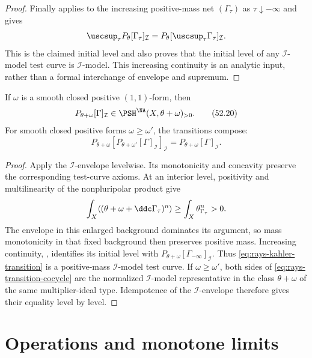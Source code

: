 \begin{proof}
Finally \cite[Proposition~3.2.13]{XiaBook} applies to the increasing
positive-mass net $(\Gamma_\tau)$ as $\tau\downarrow-\infty$ and gives
\[
 \uscsup_\tau P_\theta[\Gamma_\tau]_{\mathcal I}
 =P_\theta[\uscsup_\tau\Gamma_\tau]_{\mathcal I}.
\]
This is the claimed initial level and also proves that the initial level
of any $\mathcal I$-model test curve is $\mathcal I$-model.
This increasing continuity is an analytic input, rather than a formal
interchange of envelope and supremum.
\end{proof}

\begin{proposition}\label{prop:rays-kahler-transition}
If $\omega$ is a smooth closed positive $(1,1)$-form, then
\[
 P_{\theta+\omega}[\Gamma]_{\mathcal I}
 \in\PSH^{\NA}(X,\theta+\omega)_{>0}.
\tag{52.20}\label{eq:rays-kahler-transition}
\]
For smooth closed positive forms $\omega\geq\omega'$, the transitions compose:
\[
 P_{\theta+\omega}
 [P_{\theta+\omega'}[\Gamma]_{\mathcal I}]_{\mathcal I}
 =P_{\theta+\omega}[\Gamma]_{\mathcal I}.
\tag{52.21}\label{eq:rays-transition-cocycle}
\]
\end{proposition}

\begin{proof}
Apply the $\mathcal I$-envelope levelwise. Its monotonicity and
concavity preserve the corresponding test-curve axioms. At an interior
level, positivity and multilinearity of the nonpluripolar product give
\[
 \int_X\langle(\theta+\omega+\ddc\Gamma_\tau)^n\rangle
 \geq\int_X\theta_{\Gamma_\tau}^n>0.
\]
The envelope in this enlarged background dominates its argument, so
mass monotonicity in that fixed background then preserves positive mass.
Increasing continuity, \cite[Proposition~3.2.13]{XiaBook}, identifies its
initial level with $P_{\theta+\omega}[\Gamma_{-\infty}]_{\mathcal I}$.
Thus \eqref{eq:rays-kahler-transition} is a positive-mass
$\mathcal I$-model test curve.  If $\omega\geq\omega'$, both sides of
\eqref{eq:rays-transition-cocycle} are the normalized
$\mathcal I$-model representative in the class $\theta+\omega$ of
the same multiplier-ideal type.  Idempotence of the
$\mathcal I$-envelope therefore gives their equality level by level.
\end{proof}

\section{Operations and monotone limits}
\label{sec:rays-operations}

